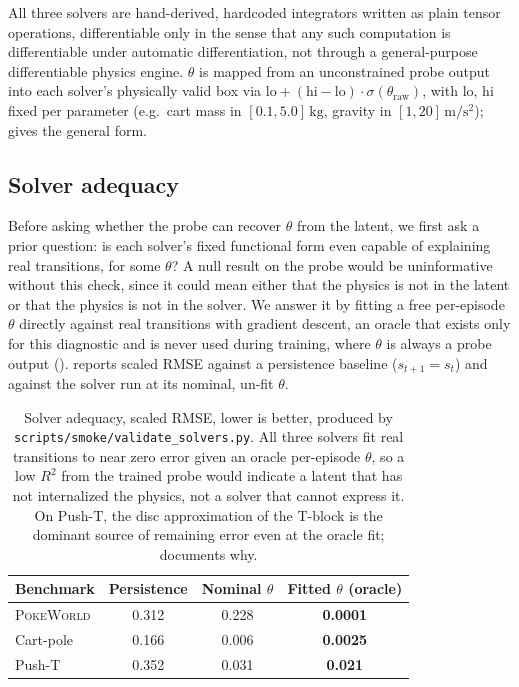 All three solvers are hand-derived, hardcoded integrators written as
plain tensor operations, differentiable only in the sense that any
such computation is differentiable under automatic differentiation,
not through a general-purpose differentiable physics engine. $\theta$
is mapped from an unconstrained probe output into each solver's
physically valid box via $\mathrm{lo} + (\mathrm{hi} - \mathrm{lo})
\cdot \sigma(\theta_{\mathrm{raw}})$, with $\mathrm{lo}$, $\mathrm{hi}$
fixed per parameter (e.g.\ cart mass in $[0.1, 5.0]\,\mathrm{kg}$,
gravity in $[1, 20]\,\mathrm{m/s^2}$);  gives
the general form.

\subsection{Solver adequacy}
\label{sec:setup-adequacy}

Before asking whether the probe can recover $\theta$ from the latent,
we first ask a prior question: is each solver's fixed functional form
even capable of explaining real transitions, for some $\theta$? A null
result on the probe would be uninformative without this check, since
it could mean either that the physics is not in the latent or that the
physics is not in the solver. We answer it by fitting a free
per-episode $\theta$ directly against real transitions with gradient
descent, an oracle that exists only for this diagnostic and is never
used during \method training, where $\theta$ is always a probe output
().  reports
scaled RMSE against a persistence baseline ($s_{t+1} = s_t$) and
against the solver run at its nominal, un-fit $\theta$.

\begin{table}[t]
\centering
\begin{tabular}{lccc}
\toprule
Benchmark & Persistence & Nominal $\theta$ & Fitted $\theta$ (oracle) \\
\midrule
\textsc{PokeWorld} & 0.312 & 0.228 & \textbf{0.0001} \\
Cart-pole          & 0.166 & 0.006 & \textbf{0.0025} \\
Push-T             & 0.352 & 0.031 & \textbf{0.021}  \\
\bottomrule
\end{tabular}
\caption{Solver adequacy, scaled RMSE, lower is better, produced by
\texttt{scripts/smoke/validate\_solvers.py}. All three solvers fit
real transitions to near zero error given an oracle per-episode
$\theta$, so a low $R^2$ from the trained probe would indicate a
latent that has not internalized the physics, not a solver that
cannot express it. On Push-T, the
disc approximation of the T-block is the dominant source of remaining
error even at the oracle fit;  documents
why.}
\label{tab:solver-adequacy}
\end{table}

